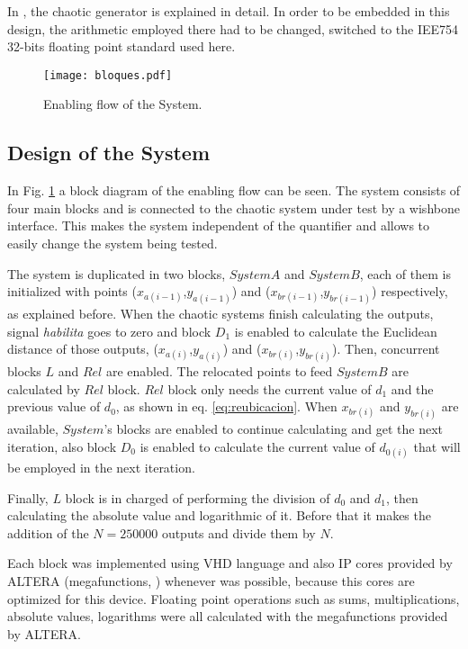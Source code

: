 In \cite{Antonelli2012}, the chaotic generator is explained in
detail. In order to be embedded in this design, the arithmetic
employed there had to be changed, switched to the IEE754 32-bits
floating point standard used here.




\begin{figure}
    \centering
    \texttt{[image: bloques.pdf]}\\
    \caption{Enabling flow of the System.}\label{bloques}
\end{figure}

\subsection{Design of the System}

In Fig. \ref{bloques} a block diagram of the enabling flow can be
seen. The system consists of four main blocks and is connected to
the chaotic system under test by a wishbone interface. This makes
the system independent of the quantifier and allows to easily
change the system being tested.

The system is duplicated in two blocks, $System A$ and $System B$,
each of them is initialized with points
($x_{a(i-1)}$,$y_{a(i-1)}$) and ($x_{br(i-1)}$,$y_{br(i-1)}$)
respectively, as explained before. When the chaotic systems finish
calculating the outputs, signal \textit{habilita} goes to zero and
 block $D_1$ is enabled to calculate the Euclidean distance of
those outputs, ($x_{a(i)}$,$y_{a(i)}$) and
($x_{br(i)}$,$y_{br(i)}$). Then, concurrent blocks $L$ and $Rel$
are enabled. The relocated points to feed $System B$ are
calculated by $Rel$ block. $Rel$ block only needs the current
value of $d_1$ and the previous value of $d_0$, as shown in eq.
\ref{eq:reubicacion}. When $x_{br(i)}$ and $y_{br(i)}$ are
available, $System$'s blocks are enabled to continue calculating
and get the next iteration, also block $D_0$ is enabled to
calculate the current value of $d_{0(i)}$ that will be employed in
the next iteration.

Finally, $L$ block is in charged of performing the division of
$d_0$ and $d_1$, then calculating the absolute value and
logarithmic of it. Before that it makes the addition of the
$N=250000$ outputs and divide them by $N$.

Each block was implemented using VHD language and also IP cores
provided by ALTERA (megafunctions, \cite{MEGAFUNCTIONS}) whenever
was possible, because this cores are optimized for this device.
Floating point operations such as sums, multiplications, absolute
values, logarithms were all calculated with the megafunctions
provided by ALTERA.


